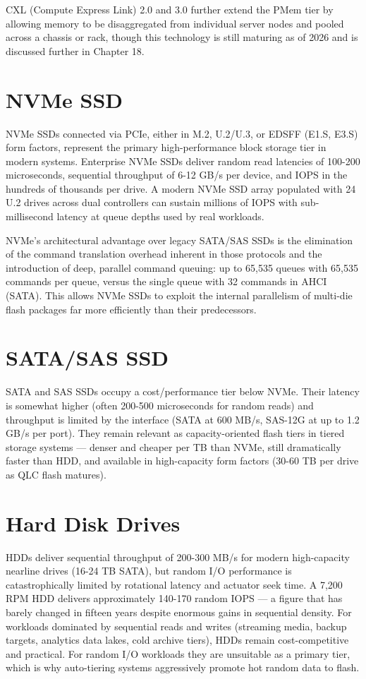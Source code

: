 CXL (Compute Express Link) 2.0 and 3.0 further extend the PMem tier by allowing memory to be disaggregated from individual server nodes and pooled across a chassis or rack, though this technology is still maturing as of 2026 and is discussed further in Chapter 18.

\section{NVMe SSD}
NVMe SSDs connected via PCIe, either in M.2, U.2/U.3, or EDSFF (E1.S, E3.S) form factors, represent the primary high-performance block storage tier in modern systems. Enterprise NVMe SSDs deliver random read latencies of 100-200 microseconds, sequential throughput of 6-12 GB/s per device, and IOPS in the hundreds of thousands per drive. A modern NVMe SSD array populated with 24 U.2 drives across dual controllers can sustain millions of IOPS with sub-millisecond latency at queue depths used by real workloads.

NVMe's architectural advantage over legacy SATA/SAS SSDs is the elimination of the command translation overhead inherent in those protocols and the introduction of deep, parallel command queuing: up to 65,535 queues with 65,535 commands per queue, versus the single queue with 32 commands in AHCI (SATA). This allows NVMe SSDs to exploit the internal parallelism of multi-die flash packages far more efficiently than their predecessors.

\section{SATA/SAS SSD}
SATA and SAS SSDs occupy a cost/performance tier below NVMe. Their latency is somewhat higher (often 200-500 microseconds for random reads) and throughput is limited by the interface (SATA at 600 MB/s, SAS-12G at up to 1.2 GB/s per port). They remain relevant as capacity-oriented flash tiers in tiered storage systems --- denser and cheaper per TB than NVMe, still dramatically faster than HDD, and available in high-capacity form factors (30-60 TB per drive as QLC flash matures).

\section{Hard Disk Drives}
HDDs deliver sequential throughput of 200-300 MB/s for modern high-capacity nearline drives (16-24 TB SATA), but random I/O performance is catastrophically limited by rotational latency and actuator seek time. A 7,200 RPM HDD delivers approximately 140-170 random IOPS --- a figure that has barely changed in fifteen years despite enormous gains in sequential density. For workloads dominated by sequential reads and writes (streaming media, backup targets, analytics data lakes, cold archive tiers), HDDs remain cost-competitive and practical. For random I/O workloads they are unsuitable as a primary tier, which is why auto-tiering systems aggressively promote hot random data to flash.

